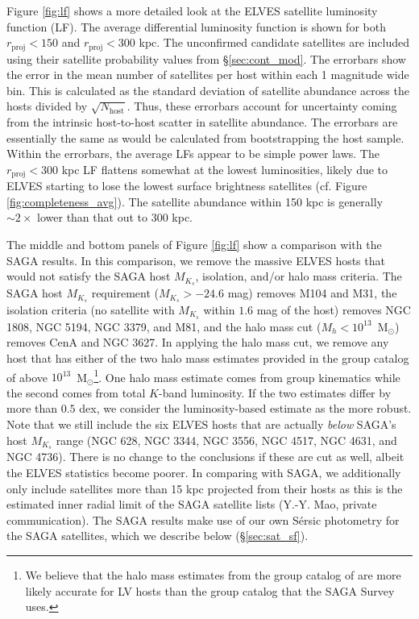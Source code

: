 \documentclass[twocolumn]{aastex62}
\newcommand{\msun}{M$_\odot$}
\begin{document}
Figure \ref{fig:lf} shows a more detailed look at the ELVES satellite luminosity function (LF). The average differential luminosity function is shown for both $r_\mathrm{proj}<150$ and $r_\mathrm{proj}<300$ kpc. The unconfirmed candidate satellites are included using their satellite probability values from \S\ref{sec:cont_mod}. The errorbars show the error in the mean number of satellites per host within each 1 magnitude wide bin. This is calculated as the standard deviation of satellite abundance across the hosts divided by $\sqrt{N_\mathrm{host}}$. Thus, these errorbars account for uncertainty coming from the intrinsic host-to-host scatter in satellite abundance. The errorbars are essentially the same as would be calculated from bootstrapping the host sample. Within the errorbars, the average LFs appear to be simple power laws. The $r_\mathrm{proj}<300$ kpc LF flattens somewhat at the lowest luminosities, likely due to ELVES starting to lose the lowest surface brightness satellites (cf. Figure \ref{fig:completeness_avg}). The satellite abundance within 150 kpc is generally $\sim2\times$ lower than that out to 300 kpc. 


The middle and bottom panels of Figure \ref{fig:lf} show a comparison with the SAGA results. In this comparison, we remove the massive ELVES hosts that would not satisfy the SAGA host $M_{K_s}$, isolation, and/or halo mass criteria. The SAGA host $M_{K_s}$ requirement ($M_{K_s}>-24.6$ mag) removes M104 and M31, the isolation criteria (no satellite with $M_{K_s}$ within $1.6$ mag of the host) removes NGC 1808, NGC 5194, NGC 3379, and M81, and the halo mass cut ($M_h<10^{13}$~\msun) removes CenA and NGC 3627. In applying the halo mass cut, we remove any host that has either of the two halo mass estimates provided in the group catalog of \citet{kourkchi2017} above $10^{13}$~\msun\footnote{We believe that the halo mass estimates from the group catalog of \citet{kourkchi2017} are more likely accurate for LV hosts than the group catalog \citep{lim2017} that the SAGA Survey uses.}. One halo mass estimate comes from group kinematics while the second comes from total $K$-band luminosity. If the two estimates differ by more than $0.5$ dex, we consider the luminosity-based estimate as the more robust. Note that we still include the six ELVES hosts that are actually \textit{below} SAGA's host $M_{K_s}$ range (NGC 628, NGC 3344, NGC 3556, NGC 4517, NGC 4631, and NGC 4736). There is no change to the conclusions if these are cut as well, albeit the ELVES statistics become poorer. In comparing with SAGA, we additionally only include satellites more than 15 kpc projected from their hosts as this is the estimated inner radial limit of the SAGA satellite lists (Y.-Y. Mao, private communication). The SAGA results make use of our own S\'{e}rsic photometry for the SAGA satellites, which we describe below (\S\ref{sec:sat_sf}).
\end{document}
